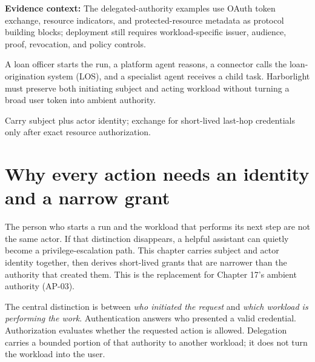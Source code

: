 

\begin{bookquote}

\textbf{Evidence context:} The delegated-authority examples use OAuth token exchange, resource indicators, and protected-resource metadata as protocol building blocks; deployment still requires workload-specific issuer, audience, proof, revocation, and policy controls. \textbf{}

\end{bookquote}

\begin{bookcallout}
A loan officer starts the run, a platform agent reasons, a connector calls the loan-origination system (LOS), and a specialist agent receives a child task. Harborlight must preserve both initiating subject and acting workload without turning a broad user token into ambient authority.
\end{bookcallout}

\begin{bookcallout}
Carry subject plus actor identity; exchange for short-lived last-hop credentials only after exact resource authorization.
\end{bookcallout}

\section{Why every action needs an identity and a narrow grant}

The person who starts a run and the workload that performs its next step are not the same actor. If that distinction disappears, a helpful assistant can quietly become a privilege-escalation path. This chapter carries subject and actor identity together, then derives short-lived grants that are narrower than the authority that created them. This is the replacement for Chapter 17's ambient authority (AP-03).\par

The central distinction is between \emph{who initiated the request} and \emph{which workload is performing the work}. Authentication answers who presented a valid credential. Authorization evaluates whether the requested action is allowed. Delegation carries a bounded portion of that authority to another workload; it does not turn the workload into the user.\par

